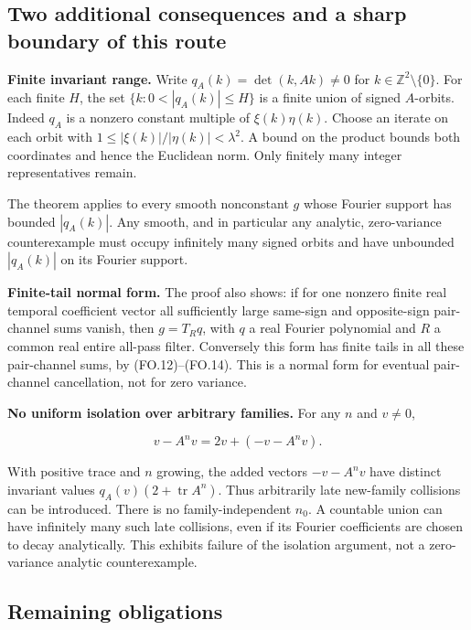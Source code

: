 \hypertarget{two-additional-consequences-and-a-sharp-boundary-of-this-route}{%
\subsection{Two additional consequences and a sharp boundary of this route}\label{two-additional-consequences-and-a-sharp-boundary-of-this-route}}

\textbf{Finite invariant range.} Write \(q_A(k)=\det(k,Ak)\ne0\) for \(k\in\mathbb Z^2\setminus\{0\}\). For each finite \(H\), the set \(\{k:0<|q_A(k)|\le H\}\) is a finite union of signed \(A\)-orbits. Indeed \(q_A\) is a nonzero constant multiple of \(\xi(k)\eta(k)\). Choose an iterate on each orbit with \(1\le|\xi(k)|/|\eta(k)|<\lambda^2\). A bound on the product bounds both coordinates and hence the Euclidean norm. Only finitely many integer representatives remain.

The theorem applies to every smooth nonconstant \(g\) whose Fourier support has bounded \(|q_A(k)|\). Any smooth, and in particular any analytic, zero-variance counterexample must occupy infinitely many signed orbits and have unbounded \(|q_A(k)|\) on its Fourier support.

\textbf{Finite-tail normal form.} The proof also shows: if for one nonzero finite real temporal coefficient vector all sufficiently large same-sign and opposite-sign pair-channel sums vanish, then \(g=T_Rq\), with \(q\) a real Fourier polynomial and \(R\) a common real entire all-pass filter. Conversely this form has finite tails in all these pair-channel sums, by (FO.12)--(FO.14). This is a normal form for eventual pair-channel cancellation, not for zero variance.

\textbf{No uniform isolation over arbitrary families.} For any \(n\) and \(v\ne0\),

\[
 v-A^n v=2v+(-v-A^n v).
\tag{FO.17}
\]

With positive trace and \(n\) growing, the added vectors \(-v-A^nv\) have distinct invariant values \(q_A(v)(2+\operatorname{tr}A^n)\). Thus arbitrarily late new-family collisions can be introduced. There is no family-independent \(n_0\). A countable union can have infinitely many such late collisions, even if its Fourier coefficients are chosen to decay analytically. This exhibits failure of the isolation argument, not a zero-variance analytic counterexample.

\hypertarget{remaining-obligations}{%
\subsection{Remaining obligations}\label{remaining-obligations}}


